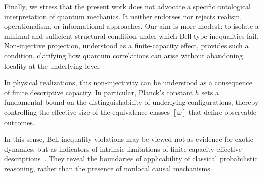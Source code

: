   Finally, we stress that the present work does not advocate a specific ontological
  interpretation of quantum mechanics.
  It neither endorses nor rejects realism, operationalism, or informational approaches.
  Our aim is more modest: to isolate a minimal and sufficient structural condition under
  which Bell-type inequalities fail.
  Non-injective projection, understood as a finite-capacity effect, provides such a
  condition, clarifying how quantum correlations can arise without abandoning locality
  at the underlying level.

  In physical realizations, this non-injectivity can be understood as a consequence
  of finite descriptive capacity.
  In particular, Planck's constant $h$ sets a fundamental bound on the
  distinguishability of underlying configurations, thereby controlling the effective
  size of the equivalence classes $[\omega]$ that define observable outcomes.

  In this sense, Bell inequality violations may be viewed not as evidence for exotic
  dynamics, but as indicators of intrinsic limitations of finite-capacity effective
  descriptions~\cite{Spekkens2007Epistemic}.
  They reveal the boundaries of applicability of classical probabilistic reasoning,
  rather than the presence of nonlocal causal mechanisms.
